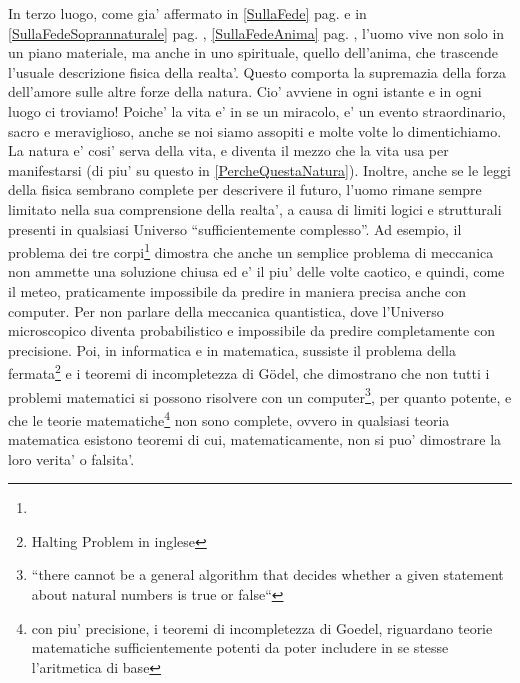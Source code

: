 In terzo luogo, come gia' affermato in \ref{SullaFede} pag. \pageref{SullaFede} e in \ref{SullaFedeSoprannaturale} pag. \pageref{SullaFedeSoprannaturale}, \ref{SullaFedeAnima} pag. \pageref{SullaFedeAnima}, l'uomo vive non solo in un piano materiale, ma anche in uno spirituale, quello dell'anima, che trascende l'usuale descrizione fisica della realta'. Questo comporta la supremazia della forza dell'amore sulle altre forze della natura. Cio' avviene in ogni istante e in ogni luogo ci troviamo! Poiche' la vita e' in se un miracolo, e' un evento straordinario, sacro e meraviglioso, anche se noi siamo assopiti e molte volte lo dimentichiamo. La natura e' cosi' serva della vita, e diventa il mezzo che la vita usa per manifestarsi (di piu' su questo in \ref{PercheQuestaNatura}). Inoltre, anche se le leggi della fisica sembrano complete per descrivere il futuro, l'uomo rimane sempre limitato nella sua comprensione della realta', a causa di limiti logici e strutturali presenti in qualsiasi Universo ``sufficientemente complesso''. Ad esempio, il problema dei tre corpi\footnote{} dimostra che anche un semplice problema di meccanica non ammette una soluzione chiusa ed e' il piu' delle volte caotico, e quindi, come il meteo, praticamente impossibile da predire in maniera precisa anche con computer. Per non parlare della meccanica quantistica, dove l'Universo microscopico diventa probabilistico e impossibile da predire completamente con precisione. Poi, in informatica e in matematica, sussiste il problema della fermata\footnote{Halting Problem in inglese} e i teoremi di incompletezza di Gödel, che dimostrano che non tutti i problemi matematici si possono risolvere con un computer\footnote{``there cannot be a general algorithm that decides whether a given statement about natural numbers is true or false`` }, per quanto potente, e che le teorie matematiche\footnote{con piu' precisione, i teoremi di incompletezza di Goedel, riguardano teorie matematiche sufficientemente potenti da poter includere in se stesse l'aritmetica di base} non sono complete, ovvero in qualsiasi teoria matematica esistono  teoremi di cui, matematicamente, non si puo' dimostrare la loro verita' o falsita'. \\

